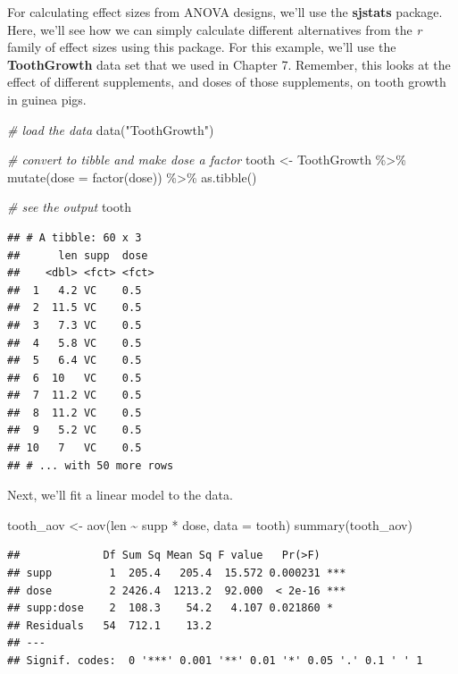 \documentclass[
]{book}
\newenvironment{Shaded}{\begin{snugshade}}{\end{snugshade}}
\newcommand{\AttributeTok}[1]{\textcolor[rgb]{0.77,0.63,0.00}{#1}}
\newcommand{\CommentTok}[1]{\textcolor[rgb]{0.56,0.35,0.01}{\textit{#1}}}
\newcommand{\FunctionTok}[1]{\textcolor[rgb]{0.00,0.00,0.00}{#1}}
\newcommand{\NormalTok}[1]{#1}
\newcommand{\OtherTok}[1]{\textcolor[rgb]{0.56,0.35,0.01}{#1}}
\newcommand{\SpecialCharTok}[1]{\textcolor[rgb]{0.00,0.00,0.00}{#1}}
\newcommand{\StringTok}[1]{\textcolor[rgb]{0.31,0.60,0.02}{#1}}
\begin{document}
For calculating effect sizes from ANOVA designs, we'll use the \textbf{sjstats} package. Here, we'll see how we can simply calculate different alternatives from the \emph{r} family of effect sizes using this package. For this example, we'll use the \textbf{ToothGrowth} data set that we used in Chapter 7. Remember, this looks at the effect of different supplements, and doses of those supplements, on tooth growth in guinea pigs.

\begin{Shaded}
\begin{Highlighting}[]
\CommentTok{\# load the data}
\FunctionTok{data}\NormalTok{(}\StringTok{"ToothGrowth"}\NormalTok{)}

\CommentTok{\# convert to tibble and make dose a factor}
\NormalTok{tooth }\OtherTok{\textless{}{-}}\NormalTok{ ToothGrowth }\SpecialCharTok{\%\textgreater{}\%}
  \FunctionTok{mutate}\NormalTok{(}\AttributeTok{dose =} \FunctionTok{factor}\NormalTok{(dose)) }\SpecialCharTok{\%\textgreater{}\%}
  \FunctionTok{as.tibble}\NormalTok{()}

\CommentTok{\# see the output}
\NormalTok{tooth}
\end{Highlighting}
\end{Shaded}

\begin{verbatim}
## # A tibble: 60 x 3
##      len supp  dose 
##    <dbl> <fct> <fct>
##  1   4.2 VC    0.5  
##  2  11.5 VC    0.5  
##  3   7.3 VC    0.5  
##  4   5.8 VC    0.5  
##  5   6.4 VC    0.5  
##  6  10   VC    0.5  
##  7  11.2 VC    0.5  
##  8  11.2 VC    0.5  
##  9   5.2 VC    0.5  
## 10   7   VC    0.5  
## # ... with 50 more rows
\end{verbatim}

Next, we'll fit a linear model to the data.

\begin{Shaded}
\begin{Highlighting}[]
\NormalTok{tooth\_aov }\OtherTok{\textless{}{-}} \FunctionTok{aov}\NormalTok{(len }\SpecialCharTok{\textasciitilde{}}\NormalTok{ supp }\SpecialCharTok{*}\NormalTok{ dose, }\AttributeTok{data =}\NormalTok{ tooth)}
\FunctionTok{summary}\NormalTok{(tooth\_aov)}
\end{Highlighting}
\end{Shaded}

\begin{verbatim}
##             Df Sum Sq Mean Sq F value   Pr(>F)    
## supp         1  205.4   205.4  15.572 0.000231 ***
## dose         2 2426.4  1213.2  92.000  < 2e-16 ***
## supp:dose    2  108.3    54.2   4.107 0.021860 *  
## Residuals   54  712.1    13.2                     
## ---
## Signif. codes:  0 '***' 0.001 '**' 0.01 '*' 0.05 '.' 0.1 ' ' 1
\end{verbatim}
\end{document}
